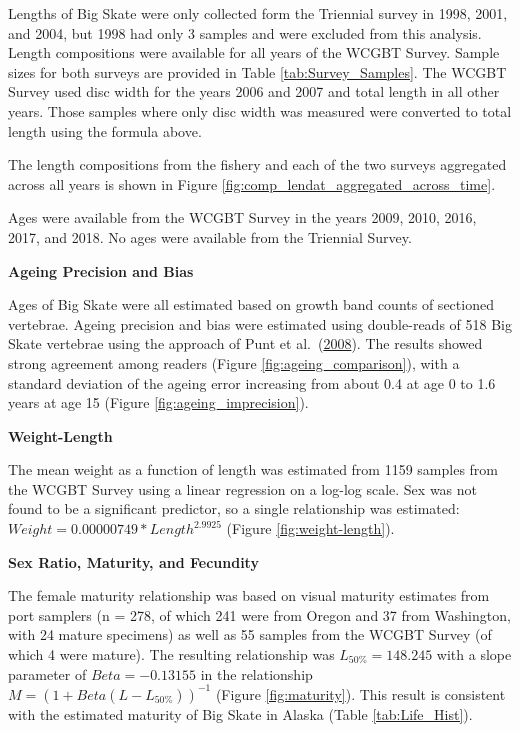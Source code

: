 \documentclass[12pt,]{article}
\begin{document}
Lengths of Big Skate were only collected form the Triennial survey in
1998, 2001, and 2004, but 1998 had only 3 samples and were excluded from
this analysis. Length compositions were available for all years of the
WCGBT Survey. Sample sizes for both surveys are provided in Table
\ref{tab:Survey_Samples}. The WCGBT Survey used disc width for the years
2006 and 2007 and total length in all other years. Those samples where
only disc width was measured were converted to total length using the
formula above.

The length compositions from the fishery and each of the two surveys
aggregated across all years is shown in Figure
\ref{fig:comp_lendat_aggregated_across_time}.

Ages were available from the WCGBT Survey in the years 2009, 2010, 2016,
2017, and 2018. No ages were available from the Triennial Survey.

\vspace{.5cm}

\textbf{Ageing Precision and Bias}

Ages of Big Skate were all estimated based on growth band counts of
sectioned vertebrae. Ageing precision and bias were estimated using
double-reads of 518 Big Skate vertebrae using the approach of Punt et
al.~(\protect\hyperlink{ref-Punt2008}{2008}). The results showed strong
agreement among readers (Figure \ref{fig:ageing_comparison}), with a
standard deviation of the ageing error increasing from about 0.4 at age
0 to 1.6 years at age 15 (Figure \ref{fig:ageing_imprecision}).

\vspace{.5cm}

\textbf{Weight-Length}

The mean weight as a function of length was estimated from 1159 samples
from the WCGBT Survey using a linear regression on a log-log scale. Sex
was not found to be a significant predictor, so a single relationship
was estimated: \(Weight = 0.00000749 * Length ^ {2.9925}\) (Figure
\ref{fig:weight-length}).

\vspace{.5cm}

\textbf{Sex Ratio, Maturity, and Fecundity}

The female maturity relationship was based on visual maturity estimates
from port samplers (n = 278, of which 241 were from Oregon and 37 from
Washington, with 24 mature specimens) as well as 55 samples from the
WCGBT Survey (of which 4 were mature). The resulting relationship was
\(L_{50\%} = 148.245\) with a slope parameter of \(Beta = -0.13155\) in
the relationship \(M = (1 + Beta(L - L_{50\%}))^{-1}\) (Figure
\ref{fig:maturity}). This result is consistent with the estimated
maturity of Big Skate in Alaska (Table \ref{tab:Life_Hist}).
\end{document}
